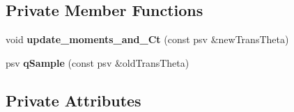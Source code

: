 \subsection*{Private Member Functions}
\begin{DoxyCompactItemize}
\item 
\mbox{\label{classada__pmmh_adddc585ea12dec19e3ac3c03d5c56d2e}} 
void {\bfseries update\+\_\+moments\+\_\+and\+\_\+\+Ct} (const psv \&new\+Trans\+Theta)
\item 
\mbox{\label{classada__pmmh_aad55e7f0dc8dbfa1ffff00d9d855a081}} 
psv {\bfseries q\+Sample} (const psv \&old\+Trans\+Theta)
\end{DoxyCompactItemize}
\subsection*{Private Attributes}
